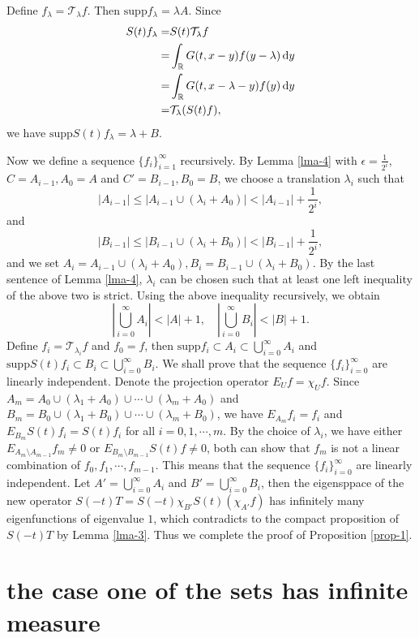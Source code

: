 \documentclass[12pt]{amsart}
\def\d{{\,\rm d}}
\theoremstyle{definition}
\numberwithin{equation}{section}
\begin{document}
Define $f_{\lambda}=\mathcal{T}_{\lambda}f$. Then $\mathrm{supp}f_\lambda=\lambda A$. Since
\begin{align*}
  S(t)f_\lambda=& S(t)\mathcal{T}_{\lambda}f\\
  =& \int_{\mathbb{R}}G(t,x-y)f(y-\lambda) \d y\\
  =&  \int_{\mathbb{R}} G(t,x-\lambda-y)f(y)\d y\\
  =& \mathcal{T}_{\lambda}(S(t)f),
\end{align*} 
we have $\mathrm{supp}S(t)f_\lambda=\lambda +B$.

Now we define a sequence $\{f_i\}_{i=1}^{\infty}$ recursively. By Lemma \ref{lma-4} with $\epsilon=\frac{1}{2^i}$, $C=A_{i-1},A_0=A$ and $C'=B_{i-1},B_0=B$, we choose a translation $\lambda_i$ such that
$$
|A_{i-1}|\le |A_{i-1}\cup (\lambda_i+A_0)|<|A_{i-1}|+\frac{1}{2^i},
$$ 
and
$$
|B_{i-1}|\le |B_{i-1}\cup (\lambda_i+B_0)|<|B_{i-1}|+\frac{1}{2^i},
$$ 
and we set $A_i=A_{i-1}\cup (\lambda_i+ A_0), B_i=B_{i-1}\cup (\lambda_i+ B_0)$. By the last sentence of Lemma \ref{lma-4}, $\lambda_i$ can be chosen such that at least one left inequality of the above two is strict. Using the above inequality recursively, we obtain
$$
|\bigcup_{i=0}^{\infty}A_i|<|A|+1,\quad |\bigcup_{i=0}^{\infty}B_i|<|B|+1.
$$
Define $f_i=\mathcal{T}_{\lambda_i}f$ and $f_0=f$, then $\mathrm{supp}f_i\subset A_i\subset \bigcup_{i=0}^{\infty}A_i$ and $\mathrm{supp}S(t)f_i\subset B_i\subset \bigcup_{i=0}^{\infty}B_i$. We shall prove that the sequence $\{ f_i\}_{i=0}^{\infty}$ are linearly independent. Denote the projection operator $E_{U}f=\chi_{U}f$. Since $A_m=A_0\cup (\lambda_1+ A_0)\cup\cdots \cup (\lambda_m +A_0)$ and $B_m=B_0\cup (\lambda_1+ B_0)\cup \cdots \cup (\lambda_m+ B_0)$, we have $E_{A_m}f_i=f_i$ and $E_{B_m}S(t)f_i=S(t)f_i$ for all $i=0,1,\cdots,m$. By the choice of $\lambda_i$, we have either $E_{A_m\setminus A_{m-1}}f_m\neq 0$ or $E_{B_m\setminus B_{m-1}}S(t)f\neq 0$, both can show that $f_m$ is not a linear combination of $f_0,f_1,\cdots,f_{m-1}$. This means that the sequence $\{f_i\}_{i=0}^{\infty}$ are linearly independent. Let $A'=\bigcup_{i=0}^{\infty}A_i$ and $B'=\bigcup_{i=0}^{\infty}B_i$, then the eigensppace of the new operator $S(-t)T=S(-t)\chi_{B'}S(t)(\chi_{A'}f)$  has infinitely many eigenfunctions of eigenvalue $1$, which contradicts to the compact proposition of $S(-t)T$ by Lemma \ref{lma-3}. Thus we complete the proof of Proposition \ref{prop-1}. 


\section{the case one of the sets has infinite measure}
\end{document}
